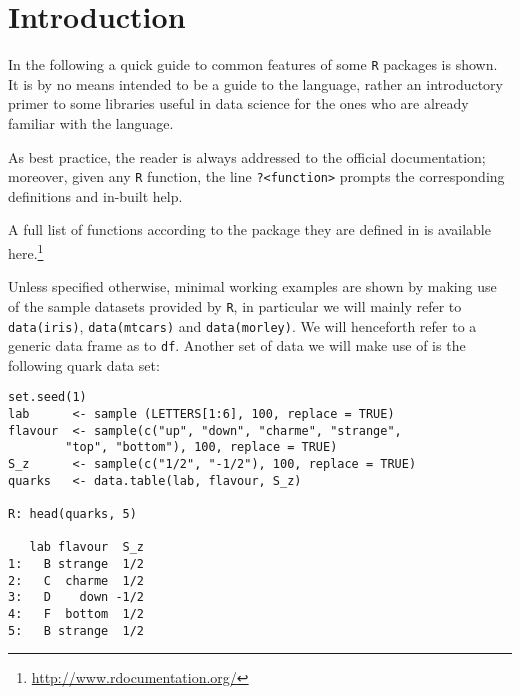 \chapter{Introduction}\label{sec: pre}
\noindent In the following a quick guide to
common features of some \texttt{R} packages
is shown. It is by no means intended to be a guide
to the language, rather an introductory
primer to some libraries useful in data 
science for the ones who are already 
familiar with the language. 

As best practice, the reader is always
addressed to the official documentation; 
moreover, given any \texttt{R} function, the 
line \texttt{?<function>} prompts the corresponding
definitions and in-built help.
\bigskip

A full list of functions according to the package 
they are defined in is available here.\footnote{ 
\url{http://www.rdocumentation.org/}}

\bigskip 

Unless specified otherwise, minimal working examples
are shown by making use of the sample datasets provided
by \texttt{R}, in particular we will mainly refer to
\texttt{data(iris)}, \texttt{data(mtcars)} and \texttt{data(morley)}. 
We will henceforth refer to a generic data frame as to \texttt{df}.
Another set of data we will make use of is the following
quark\label{quark} data set: 
\begin{verbatim}
set.seed(1)
lab      <- sample (LETTERS[1:6], 100, replace = TRUE) 
flavour  <- sample(c("up", "down", "charme", "strange", 
		"top", "bottom"), 100, replace = TRUE)
S_z      <- sample(c("1/2", "-1/2"), 100, replace = TRUE)
quarks   <- data.table(lab, flavour, S_z)

R: head(quarks, 5)

   lab flavour  S_z
1:   B strange  1/2
2:   C  charme  1/2
3:   D    down -1/2
4:   F  bottom  1/2
5:   B strange  1/2
\end{verbatim}

